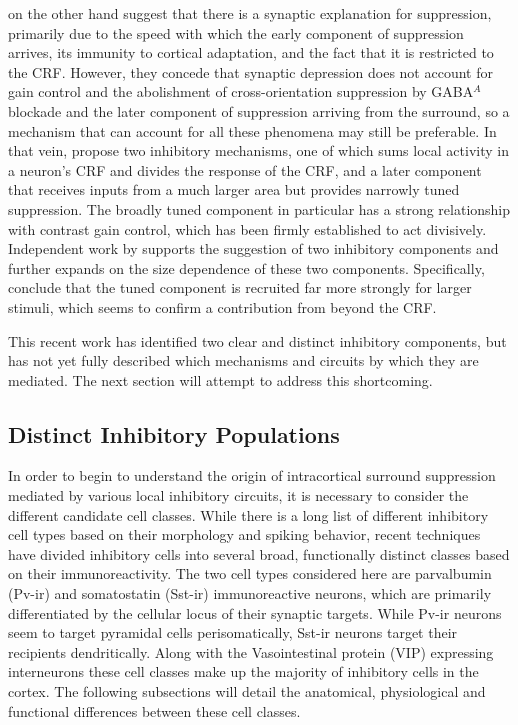 \cite{Carandini2002} on the other hand suggest that there is a
synaptic explanation for suppression, primarily due to the speed with
which the early component of suppression arrives, its immunity to
cortical adaptation, and the fact that it is restricted to the
CRF. However, they concede that synaptic depression does not account
for gain control and the abolishment of cross-orientation suppression
by GABA$^{A}$ blockade and the later component of suppression arriving
from the surround, so a mechanism that can account for all these
phenomena may still be preferable. In that vein, \cite{Webb2005}
propose two inhibitory mechanisms, one of which sums local activity in
a neuron's CRF and divides the response of the CRF, and a later
component that receives inputs from a much larger area but provides
narrowly tuned suppression. The broadly tuned component in particular
has a strong relationship with contrast gain control, which has been
firmly established to act divisively. Independent work by
\cite{Xing2005} supports the suggestion of two inhibitory components
and further expands on the size dependence of these two
components. Specifically, \cite{Xing2005} conclude that the tuned
component is recruited far more strongly for larger stimuli, which
seems to confirm a contribution from beyond the CRF.

This recent work has identified two clear and distinct inhibitory
components, but has not yet fully described which mechanisms and
circuits by which they are mediated.  The next section will attempt to
address this shortcoming.

\subsection{Distinct Inhibitory Populations} \label{InhibitoryBackground}

In order to begin to understand the origin of intracortical surround
suppression mediated by various local inhibitory circuits, it is
necessary to consider the different candidate cell classes. While
there is a long list of different inhibitory cell types based on their
morphology and spiking behavior, recent techniques have divided
inhibitory cells into several broad, functionally distinct classes
based on their immunoreactivity. The two cell types considered here
are parvalbumin (Pv-ir) and somatostatin (Sst-ir) immunoreactive
neurons, which are primarily differentiated by the cellular locus of
their synaptic targets. While Pv-ir neurons seem to target pyramidal
cells perisomatically, Sst-ir neurons target their recipients
dendritically. Along with the Vasointestinal protein (VIP) expressing
interneurons these cell classes make up the majority of inhibitory
cells in the cortex. The following subsections will detail the
anatomical, physiological and functional differences between these
cell classes.

